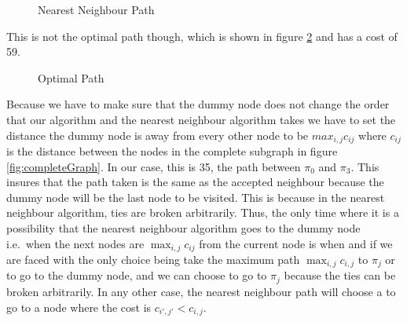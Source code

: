 \begin{figure}
\centering
{}
\caption{Nearest Neighbour Path}
\label{fig:pathOnComplete}
\end{figure}

This is not the optimal path though, which is shown in figure \ref{fig:optcompleteGraph} and has a cost of 59.

\begin{figure}
\centering
{}
\caption{Optimal Path}
\label{fig:optcompleteGraph}
\end{figure}


Because we have to make sure that the dummy node does not change the order that our algorithm and the nearest neighbour algorithm takes we have to set the distance the dummy node is away from every other node to be $max_{i,j} c_{ij} $ where $c_{ij}$ is the distance between the nodes in the complete subgraph in figure \ref{fig:completeGraph}. In our case, this is 35, the path between $\pi_0$ and $\pi_3$. This insures that the path taken is the same as the accepted neighbour because the dummy node will be the last node to be visited. This is because in the nearest neighbour algorithm, ties are broken arbitrarily. Thus, the only time where it is a possibility that the nearest neighbour algorithm goes to the dummy node i.e.\ when the next nodes are $\max_{i,j} c_{ij}$ from the current node is when and if we are faced with the only choice being take the maximum path $\max_{i,j} c_{i,j}$ to $\pi_j$ or to go to the dummy node, and we can choose to go to $\pi_j$ because the ties can be broken arbitrarily. In any other case, the nearest neighbour path will choose a to go to a node where the cost is $c_{i',j'} < c_{i,j}$. 


